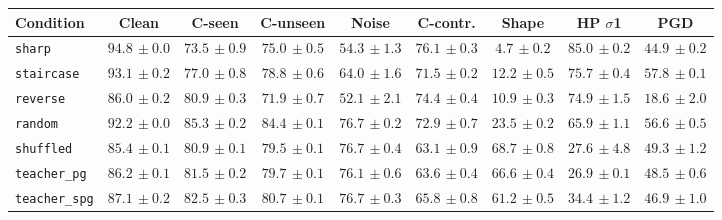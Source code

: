 \begin{tabular}{lcccccccc}
\hline
Condition & Clean & C-seen & C-unseen & Noise & C-contr. & Shape & HP $\sigma$1 & PGD \\
\hline
\texttt{sharp} & $94.8{\scriptstyle\,\pm0.0}$ & $73.5{\scriptstyle\,\pm0.9}$ & $75.0{\scriptstyle\,\pm0.5}$ & $54.3{\scriptstyle\,\pm1.3}$ & $76.1{\scriptstyle\,\pm0.3}$ & $4.7{\scriptstyle\,\pm0.2}$ & $85.0{\scriptstyle\,\pm0.2}$ & $44.9{\scriptstyle\,\pm0.2}$ \\
\texttt{staircase} & $93.1{\scriptstyle\,\pm0.2}$ & $77.0{\scriptstyle\,\pm0.8}$ & $78.8{\scriptstyle\,\pm0.6}$ & $64.0{\scriptstyle\,\pm1.6}$ & $71.5{\scriptstyle\,\pm0.2}$ & $12.2{\scriptstyle\,\pm0.5}$ & $75.7{\scriptstyle\,\pm0.4}$ & $57.8{\scriptstyle\,\pm0.1}$ \\
\texttt{reverse} & $86.0{\scriptstyle\,\pm0.2}$ & $80.9{\scriptstyle\,\pm0.3}$ & $71.9{\scriptstyle\,\pm0.7}$ & $52.1{\scriptstyle\,\pm2.1}$ & $74.4{\scriptstyle\,\pm0.4}$ & $10.9{\scriptstyle\,\pm0.3}$ & $74.9{\scriptstyle\,\pm1.5}$ & $18.6{\scriptstyle\,\pm2.0}$ \\
\texttt{random} & $92.2{\scriptstyle\,\pm0.0}$ & $85.3{\scriptstyle\,\pm0.2}$ & $84.4{\scriptstyle\,\pm0.1}$ & $76.7{\scriptstyle\,\pm0.2}$ & $72.9{\scriptstyle\,\pm0.7}$ & $23.5{\scriptstyle\,\pm0.2}$ & $65.9{\scriptstyle\,\pm1.1}$ & $56.6{\scriptstyle\,\pm0.5}$ \\
\texttt{shuffled} & $85.4{\scriptstyle\,\pm0.1}$ & $80.9{\scriptstyle\,\pm0.1}$ & $79.5{\scriptstyle\,\pm0.1}$ & $76.7{\scriptstyle\,\pm0.4}$ & $63.1{\scriptstyle\,\pm0.9}$ & $68.7{\scriptstyle\,\pm0.8}$ & $27.6{\scriptstyle\,\pm4.8}$ & $49.3{\scriptstyle\,\pm1.2}$ \\
\texttt{teacher\_pg} & $86.2{\scriptstyle\,\pm0.1}$ & $81.5{\scriptstyle\,\pm0.2}$ & $79.7{\scriptstyle\,\pm0.1}$ & $76.1{\scriptstyle\,\pm0.6}$ & $63.6{\scriptstyle\,\pm0.4}$ & $66.6{\scriptstyle\,\pm0.4}$ & $26.9{\scriptstyle\,\pm0.1}$ & $48.5{\scriptstyle\,\pm0.6}$ \\
\texttt{teacher\_spg} & $87.1{\scriptstyle\,\pm0.2}$ & $82.5{\scriptstyle\,\pm0.3}$ & $80.7{\scriptstyle\,\pm0.1}$ & $76.7{\scriptstyle\,\pm0.3}$ & $65.8{\scriptstyle\,\pm0.8}$ & $61.2{\scriptstyle\,\pm0.5}$ & $34.4{\scriptstyle\,\pm1.2}$ & $46.9{\scriptstyle\,\pm1.0}$ \\
\hline
\end{tabular}
